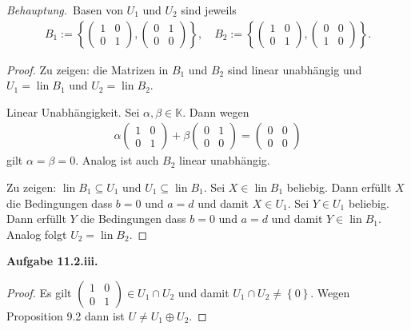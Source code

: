 \documentclass[12pt]{extarticle}
\newcommand{\mg}[1]{\mathbb{#1}}
\newcommand{\lin}{\operatorname{lin}}
\newcommand{\aufgn}[1]{\textbf{Aufgabe #1.}}
\newcommand{\beh}{\textit{Behauptung.}\ }
\begin{document}
\beh Basen von \(U_1\) und \(U_2\) sind jeweils
\begin{align*}
  B_1 := \left\{
  \begin{pmatrix}
    1 & 0 \\
    0 & 1
  \end{pmatrix},
  \begin{pmatrix}
    0 & 1 \\
    0 & 0
  \end{pmatrix}
  \right\}, \quad
  B_2 := \left\{
  \begin{pmatrix}
    1 & 0 \\
    0 & 1
  \end{pmatrix},
  \begin{pmatrix}
    0 & 0 \\
    1 & 0
  \end{pmatrix}
  \right\}.
\end{align*}

\begin{proof}
Zu zeigen: die Matrizen in \(B_1\) und \(B_2\) sind linear
unabhängig und \(U_1 = \lin B_1\) und \(U_2 = \lin B_2\).

Linear Unabhängigkeit.  Sei \(\alpha, \beta \in \mg{K}\).
Dann wegen
\begin{align*}
  \alpha
  \begin{pmatrix}
    1 & 0 \\
    0 & 1
  \end{pmatrix} +
  \beta \begin{pmatrix}
    0 & 1 \\
    0 & 0
  \end{pmatrix} =
\begin{pmatrix}
    0 & 0 \\
    0 & 0
  \end{pmatrix}
\end{align*}
gilt \(\alpha = \beta = 0\).  Analog ist auch \(B_2\) linear
unabhängig.

Zu zeigen: \(\lin B_1 \subseteq U_1\) und
\(U_1 \subseteq \lin B_1\).  Sei \(X \in \lin B_1\)
beliebig.  Dann erfüllt \(X\) die Bedingungen dass \(b=0\)
und \(a = d\) und damit \(X \in U_1\).  Sei \(Y \in U_1\)
beliebig.  Dann erfüllt \(Y\) die Bedingungen dass \(b=0\)
und \(a = d\) und damit \(Y \in \lin B_1\).  Analog folgt
\(U_2 = \lin B_2\).
\end{proof}

\aufgn{11.2.iii}

\begin{proof}
  Es gilt
  $\begin{pmatrix}
     1 & 0 \\
     0 & 1
   \end{pmatrix}
   \in U_1 \cap U_2$ und damit
   \(U_1 \cap U_2 \ne \left\{ 0 \right\}\).  Wegen
   Proposition 9.2 dann ist \(U \ne U_1 \oplus U_2\).
\end{proof}
\end{document}
